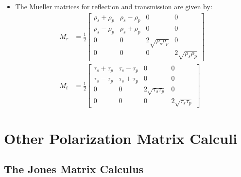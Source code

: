 \documentclass[10pt]{article}
\begin{document}
\begin{itemize}
		\item The Mueller matrices for reflection and transmission are given by:
		\begin{align*}
			M_r &= \frac{1}{2} \begin{bmatrix}
				\rho_s + \rho_p & \rho_s - \rho_p & 0 & 0 \\
				\rho_s - \rho_p & \rho_s + \rho_p & 0 & 0 \\
				0 & 0 & 2\sqrt{\rho_s \rho_p} & 0 \\
				0 & 0 & 0 & 2\sqrt{\rho_s \rho_p}
			\end{bmatrix} \\
			M_t &= \frac{1}{2} \begin{bmatrix}
				\tau_s + \tau_p & \tau_s - \tau_p & 0 & 0 \\
				\tau_s - \tau_p & \tau_s + \tau_p & 0 & 0 \\
				0 & 0 & 2\sqrt{\tau_s \tau_p} & 0 \\
				0 & 0 & 0 & 2\sqrt{\tau_s \tau_p}
			\end{bmatrix}
		\end{align*}
	\end{itemize}

	\section{Other Polarization Matrix Calculi}

	\subsection{The Jones Matrix Calculus}
\end{document}
